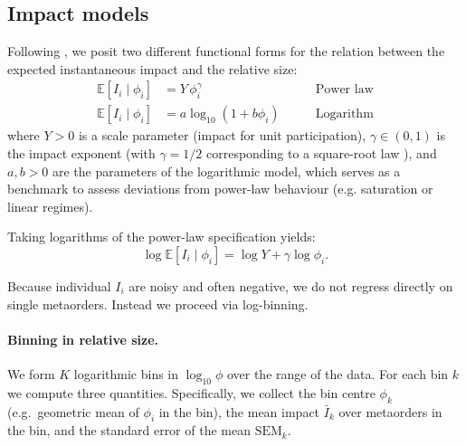 \documentclass[11pt]{article}
\newcommand{\E}{\mathbb{E}}
\begin{document}
\subsection{Impact models}
\label{subsec:impact_models}
Following \cite{zarinelli}, we posit two different functional forms for the relation between the expected 
instantaneous impact and the relative size:
\begin{align}
  \E[I_i \mid \phi_i] &= Y\,\phi_i^\gamma \qquad &\text{Power law} \nonumber \\
  \E[I_i \mid \phi_i] &= a \log_{10}(1+b\phi_i) \qquad &\text{Logarithm}
  \label{eq:impact_model}
\end{align}
where $Y > 0$ is a scale parameter (impact for unit participation), 
$\gamma \in (0,1)$ is the impact exponent (with $\gamma = 1/2$ corresponding to a square-root law 
\cite{BouchaudFarmerLillo2008,SatoKanazawa2024}), and $a, b > 0$ are the parameters of the logarithmic model,
which serves as a benchmark to assess deviations 
from power-law behaviour (e.g. saturation or linear regimes).


Taking logarithms of the power-law specification yields:
\begin{equation}
  \log \E[I_i \mid \phi_i] = \log Y + \gamma \log \phi_i.
\end{equation}

Because individual $I_i$ are noisy and often negative, we do not regress directly on single metaorders. 
Instead we proceed via log-binning.

\paragraph{Binning in relative size.}

We form $K$ logarithmic bins in $\log_{10} \phi$ over the range of the data. For each bin $k$ we compute three quantities.
Specifically, we collect the bin centre $\phi_k$ (e.g.\ geometric mean of $\phi_i$ in the bin), 
the mean impact $\bar{I}_k$ over metaorders in the bin, and the standard error of the mean $\text{SEM}_k$.

\end{document}
